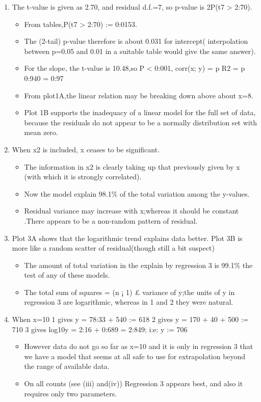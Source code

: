 \documentclass[a4paper,12pt]{article}
\begin{document}
\begin{enumerate}
    \item The t-value is given as 2.70, and residual d.f.=7, so p-value is 2P(t7 > 2:70).
    \begin{itemize}
        \item From tables,P(t7 > 2:70)
:=
0:0153.
    \end{itemize}
\begin{itemize}
    \item The (2-tail) p-value therefore is about 0.031 for intercept(
interpolation between p=0.05 and 0.01 in a suitable table would give the same
answer).
\item For the slope, the t-value is 10.48,so P < 0:001, corr(x; y) =
p
R2 =
p
0:940 = 0:97

\item From plot1A,the linear relation may be breaking down above about x=8. 
\item Plot 1B supports
the inadequacy of a linear model for the full set of data, because the residuals do not appear to be a normally distribution set with mean zero.
\end{itemize}

\item When x2 is included, x ceases to be significant.
\begin{itemize}
    \item The information in x2 is clearly
taking up that previously given by x (with which it is strongly correlated).
\item Now the model
explain 98.1\% of the total variation among the y-values.
\item Residual variance may increase with x;whereas it should be constant .There appears to
be a non-random pattern of residual.
\end{itemize}
\item Plot 3A shows that the logarithmic trend explains data better. Plot 3B is more
like a random scatter of residual(though still a bit suspect)
\begin{itemize}
\item The amount of total variation
in the explain by regression 3 is 99.1\% the test of any of these models.
\item The total sum of squares = (n ¡ 1) £ variance of y;the units of y in regression 3 are
logarithmic, whereas in 1 and 2 they were natural.
\end{itemize}
\item When x=10
1 gives y = 78:33 + 540
:=
618
2 gives y = 170 + 40 + 500
:=
710
3 gives log10y = 2:16 + 0:689 = 2:849; i:e: y
:=
706
\begin{itemize}
    \item However data do not go so far as x=10 and it is only in regression 3 that we have a
model that seems at all safe to use for extrapolation beyond the range of available data.
\item On all counts (see (iii) and(iv)) Regression 3 appears best, and also it requires only two
parameters.
\end{itemize}

\end{enumerate}
\end{document}
